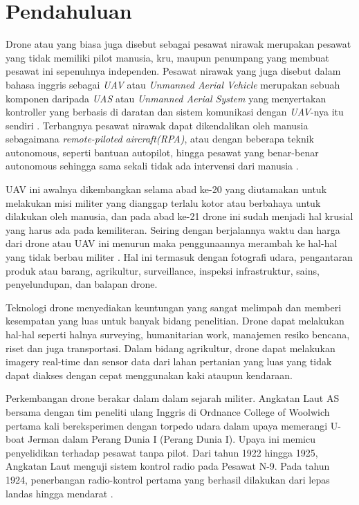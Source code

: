 \section{Pendahuluan}
\label{sec:pendahuluan}


Drone atau yang biasa juga disebut sebagai pesawat nirawak merupakan pesawat yang tidak memiliki pilot manusia, kru, maupun penumpang yang membuat pesawat ini sepenuhnya independen. Pesawat nirawak yang juga disebut dalam bahasa inggris sebagai \emph{UAV} atau \emph{Unmanned  Aerial Vehicle} merupakan sebuah komponen daripada \emph{UAS} atau \emph{Unmanned Aerial System} yang menyertakan kontroller yang berbasis di daratan dan sistem komunikasi dengan \emph{UAV}-nya itu sendiri \citep{HU2018162}. Terbangnya pesawat nirawak dapat dikendalikan oleh manusia sebagaimana \emph{remote-piloted aircraft(RPA)}, atau dengan beberapa teknik autonomous, seperti bantuan autopilot, hingga pesawat yang benar-benar autonomous sehingga sama sekali tidak ada intervensi dari manusia \citep{caryleslie2011}. 

UAV ini awalnya dikembangkan selama abad ke-20 yang diutamakan untuk melakukan misi militer yang dianggap terlalu kotor atau berbahaya untuk dilakukan oleh manusia, dan pada abad ke-21 drone ini sudah menjadi hal krusial yang harus ada pada kemiliteran. Seiring dengan berjalannya waktu dan harga dari drone atau UAV ini menurun maka penggunaannya merambah ke hal-hal yang tidak berbau militer \citep{tice2009}\citep{9423979}. Hal ini termasuk dengan fotografi udara, pengantaran produk atau barang, agrikultur, surveillance, inspeksi infrastruktur, sains\citep{drones4010005}\citep{w10050655}\citep{w10030264}\citep{w11030604}, penyelundupan\citep{dronesmuggle}, dan balapan drone. 

Teknologi drone menyediakan keuntungan yang sangat melimpah dan memberi kesempatan yang luas untuk banyak bidang penelitian. Drone dapat melakukan hal-hal seperti halnya surveying, humanitarian work, manajemen resiko bencana, riset dan juga transportasi\citep{AYAMGA2021120677}. Dalam bidang agrikultur, drone dapat melakukan imagery real-time dan sensor data dari lahan pertanian yang luas yang tidak dapat diakses dengan cepat menggunakan kaki ataupun kendaraan\citep{AYAMGA2021120677}.

Perkembangan drone berakar dalam dalam sejarah militer. Angkatan Laut AS bersama dengan tim peneliti ulang Inggris di Ordnance College of Woolwich pertama kali bereksperimen dengan torpedo udara dalam upaya memerangi U-boat Jerman dalam Perang Dunia I (Perang Dunia I). Upaya ini memicu penyelidikan terhadap pesawat tanpa pilot. Dari tahun 1922 hingga 1925, Angkatan Laut menguji sistem kontrol radio pada Pesawat N-9. Pada tahun 1924, penerbangan radio-kontrol pertama yang berhasil dilakukan dari lepas landas hingga mendarat \citep{rife2006sound}.

